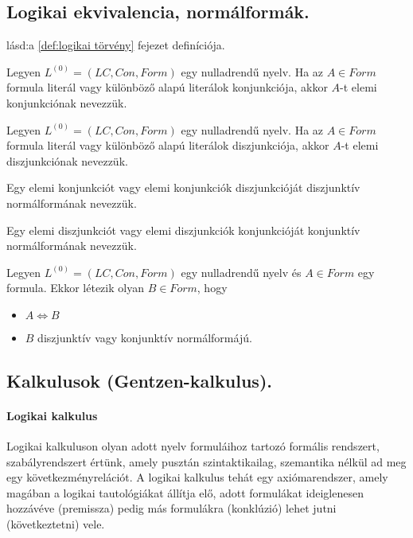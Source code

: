 \subsection{Logikai ekvivalencia, normálformák.}
\begin{definition}
	lásd:a \ref{def:logikai törvény} fejezet definíciója.
\end{definition}
\begin{definition}
	Legyen $L^{(0)} = (LC, Con, Form)$ egy nulladrendű nyelv. Ha az $A \in Form$ formula literál vagy különböző alapú literálok konjunkciója, akkor $A$-t elemi konjunkciónak nevezzük. 
\end{definition}
\begin{definition}
	Legyen $L^{(0)} = (LC, Con, Form)$ egy nulladrendű nyelv. Ha az $A \in Form$ formula literál vagy különböző alapú literálok diszjunkciója, akkor $A$-t elemi diszjunkciónak nevezzük. 
\end{definition}
\begin{definition}
	Egy elemi konjunkciót vagy elemi konjunkciók diszjunkcióját diszjunktív normálformának nevezzük. 
\end{definition}
\begin{definition}
	Egy elemi diszjunkciót vagy elemi diszjunkciók konjunkcióját konjunktív normálformának nevezzük.
\end{definition}
\begin{definition}
	Legyen $L^{(0)} = (LC, Con, Form)$ egy nulladrendű nyelv és $A \in Form$ egy formula. Ekkor létezik olyan $B \in Form$, hogy
	\begin{itemize}
		\item $A\Leftrightarrow B$
		\item $B$ diszjunktív vagy konjunktív normálformájú. 
	\end{itemize}

\end{definition}

\subsection{Kalkulusok (Gentzen-kalkulus).}

\paragraph{Logikai kalkulus} 
Logikai kalkuluson olyan adott nyelv formuláihoz tartozó formális rendszert, szabályrendszert értünk, amely pusztán szintaktikailag, szemantika nélkül ad meg egy következményrelációt. A logikai kalkulus tehát egy axiómarendszer, amely magában a logikai tautológiákat állítja elő, adott formulákat ideiglenesen hozzávéve (premissza) pedig más formulákra (konklúzió) lehet jutni (következtetni) vele.


